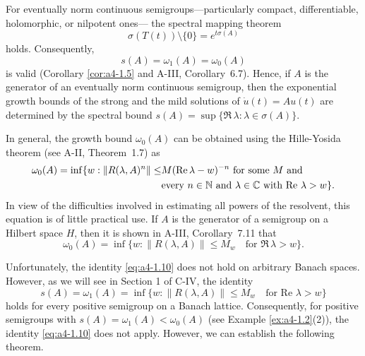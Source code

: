 \begin{remark}\label{rem:a4-1.7}
For eventually norm continuous semigroups---particularly compact, differentiable, holomorphic, or nilpotent ones--- the spectral mapping theorem 
\begin{equation}\label{eq:a4-1.7}
\sigma(T(t)) \setminus \{0\} = e^{t \sigma(A)}
\end{equation}
holds. 
Consequently,
\begin{equation}\label{eq:a4-1.8}
s(A) = \omega_1(A) = \omega_0(A)
\end{equation}
is valid (Corollary \ref{cor:a4-1.5} and A-III, Corollary~6.7).
Hence, if $A$ is the generator of an eventually norm continuous semigroup, then the exponential growth bounds of the strong and the mild solutions of $\dot{u}(t) = A u(t)$ are determined by the spectral bound
$s(A) = \sup\{\Re\,\lambda : \lambda \in \sigma(A)\}.$
\end{remark}
\begin{remark} In general, the growth bound $\omega_0(A)$ can be obtained using the Hille-Yosida theorem (see A-II, Theorem~1.7) as
\begin{align}\label{eq:a4-1.9}
\omega_0(A) = \inf \{ w : \|R(\lambda, A)^n\| \leq &M ( \Re\,\lambda - w)^{-n} \text{ for some } M \text{ and}\\
&\text{every } n \in \mathbb{N} \text{ and } \lambda \in \mathbb{C} \text{ with } \text{Re } \lambda > w\}.\notag
\end{align}
 In view of the difficulties involved in estimating all powers of the resolvent, this equation is of little practical use. 
If $A$ is the generator of a semigroup on a Hilbert space $H$, then it is shown in A-III, Corollary~7.11 that
\begin{equation}\label{eq:a4-1.10}
 \omega_0(A) = \inf \{ w : \| R(\lambda, A) \| \leq M_w \quad \text{for } \Re\,\lambda > w \}.
\end{equation}
\end{remark}
 Unfortunately, the identity \eqref{eq:a4-1.10} does not hold on arbitrary Banach spaces. 
However, as we will see in Section 1 of C-IV, the identity 
\begin{equation}\label{eq:a4-1.11}
 s(A)=\omega_1(A) = \inf \{ w : \| R(\lambda, A) \| \leq M_w \quad \text{for } \text{Re } \lambda > w \}
\end{equation}
 holds for every positive semigroup on a Banach lattice. 
Consequently, for positive semigroups with $s(A) = \omega_1(A) < \omega_0(A)$ (see Example \ref{ex:a4-1.2}(2)), the identity \eqref{eq:a4-1.10} does not apply. 
However, we can establish the following theorem.


